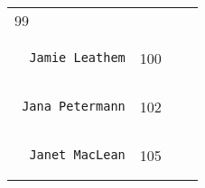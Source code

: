 \documentclass[]{article}
\begin{document}
\begin{longtable}[c]{@{}llll@{}}
\begin{minipage}[t]{0.10\columnwidth}
99
\end{minipage} & \begin{minipage}[t]{0.13\columnwidth}\raggedright
\end{minipage} & \begin{minipage}[t]{0.15\columnwidth}\raggedright
\end{minipage}
\\\noalign{\medskip}
\begin{minipage}[t]{0.39\columnwidth}\raggedright
\begin{verbatim}
  Jamie Leathem
\end{verbatim}
\end{minipage} & \begin{minipage}[t]{0.10\columnwidth}\raggedright
100
\end{minipage} & \begin{minipage}[t]{0.13\columnwidth}\raggedright
\end{minipage} & \begin{minipage}[t]{0.15\columnwidth}\raggedright
\end{minipage}
\\\noalign{\medskip}
\begin{minipage}[t]{0.39\columnwidth}\raggedright
\begin{verbatim}
 Jana Petermann
\end{verbatim}
\end{minipage} & \begin{minipage}[t]{0.10\columnwidth}\raggedright
102
\end{minipage} & \begin{minipage}[t]{0.13\columnwidth}\raggedright
\end{minipage} & \begin{minipage}[t]{0.15\columnwidth}\raggedright
\end{minipage}
\\\noalign{\medskip}
\begin{minipage}[t]{0.39\columnwidth}\raggedright
\begin{verbatim}
  Janet MacLean
\end{verbatim}
\end{minipage} & \begin{minipage}[t]{0.10\columnwidth}\raggedright
105
\end{minipage} & \begin{minipage}[t]{0.13\columnwidth}\raggedright
\end{minipage} & \begin{minipage}[t]{0.15\columnwidth}\raggedright

\end{minipage}
\end{longtable}
\end{document}
